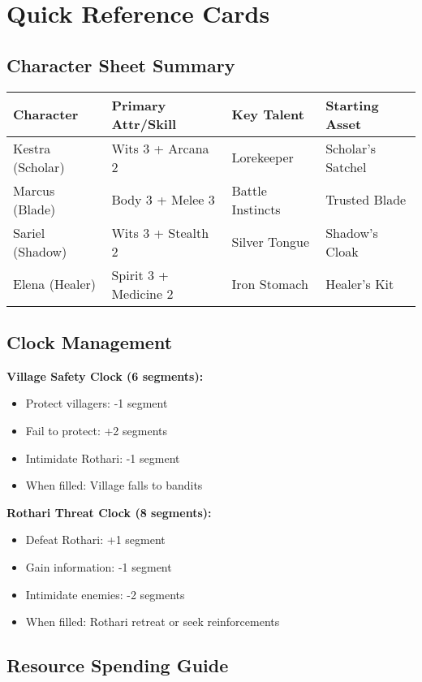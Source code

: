 \documentclass[11pt]{article}
\newcommand{\checkmark}{\ding{51}}
\begin{document}
\section{Quick Reference Cards}

\subsection{Character Sheet Summary}

\begin{tabular}{|l|l|l|l|}
\hline
\textbf{Character} & \textbf{Primary Attr/Skill} & \textbf{Key Talent} & \textbf{Starting Asset} \\
\hline
Kestra (Scholar) & Wits 3 + Arcana 2 & Lorekeeper & Scholar's Satchel \\
Marcus (Blade) & Body 3 + Melee 3 & Battle Instincts & Trusted Blade \\
Sariel (Shadow) & Wits 3 + Stealth 2 & Silver Tongue & Shadow's Cloak \\
Elena (Healer) & Spirit 3 + Medicine 2 & Iron Stomach & Healer's Kit \\
\hline
\end{tabular}

\subsection{Clock Management}

\textbf{Village Safety Clock (6 segments):}
\begin{itemize}
\item \checkmark Protect villagers: -1 segment
\item \checkmark Fail to protect: +2 segments
\item \checkmark Intimidate Rothari: -1 segment
\item When filled: Village falls to bandits
\end{itemize}

\textbf{Rothari Threat Clock (8 segments):}
\begin{itemize}
\item \checkmark Defeat Rothari: +1 segment
\item \checkmark Gain information: -1 segment
\item \checkmark Intimidate enemies: -2 segments
\item When filled: Rothari retreat or seek reinforcements
\end{itemize}

\subsection{Resource Spending Guide}
\end{document}
